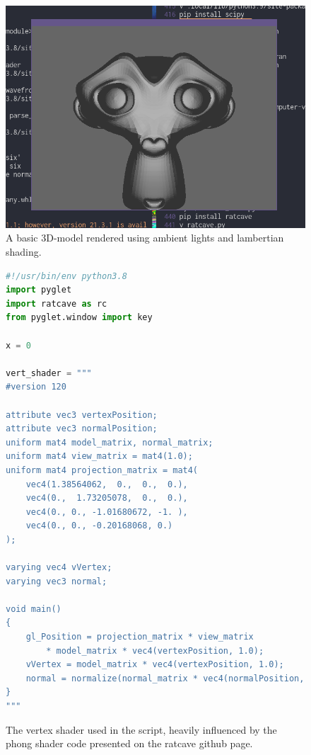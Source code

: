 \documentclass[a4paper, titlepage,12pt]{article}
\begin{document}
	\begin{figure}[H]
		\begin{center}
			\includegraphics[scale=0.4]{./monkey_man.png}
			\caption{A basic 3D-model rendered using ambient lights and lambertian shading.}
		\end{center}
	\end{figure}

	\begin{figure}[H]
		\begin{center}
			\begin{lstlisting}[language=Python]
 #!/usr/bin/env python3.8
import pyglet
import ratcave as rc
from pyglet.window import key

x = 0

vert_shader = """
#version 120

attribute vec3 vertexPosition;
attribute vec3 normalPosition;
uniform mat4 model_matrix, normal_matrix;
uniform mat4 view_matrix = mat4(1.0);
uniform mat4 projection_matrix = mat4(
    vec4(1.38564062,  0.,  0.,  0.),
    vec4(0.,  1.73205078,  0.,  0.),
    vec4(0., 0., -1.01680672, -1. ),
    vec4(0., 0., -0.20168068, 0.)
);

varying vec4 vVertex;
varying vec3 normal;

void main()
{
    gl_Position = projection_matrix * view_matrix 
		* model_matrix * vec4(vertexPosition, 1.0);
    vVertex = model_matrix * vec4(vertexPosition, 1.0);
    normal = normalize(normal_matrix * vec4(normalPosition, 1.0)).xyz;
}
"""
			\end{lstlisting}
			\caption{The vertex shader used in the script, heavily influenced by the phong shader code presented on the ratcave github page.}
		\end{center}
	\end{figure}
\end{document}
